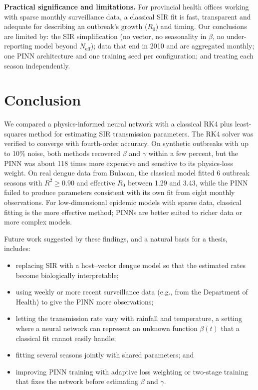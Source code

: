 \documentclass[12pt,a4paper]{article}
\newcommand{\Rzero}{R_0}
\newcommand{\Neff}{N_{\mathrm{eff}}}
\begin{document}
\textbf{Practical significance and limitations.} For provincial health offices working with sparse monthly surveillance data, a classical SIR fit is fast, transparent and adequate for describing an outbreak's growth ($\Rzero$) and timing. Our conclusions are limited by: the SIR simplification (no vector, no seasonality in $\beta$, no under-reporting model beyond $\Neff$); data that end in 2010 and are aggregated monthly; one PINN architecture and one training seed per configuration; and treating each season independently.

\section{Conclusion}

We compared a physics-informed neural network with a classical RK4 plus least-squares method for estimating SIR transmission parameters. The RK4 solver was verified to converge with fourth-order accuracy. On synthetic outbreaks with up to 10\% noise, both methods recovered $\beta$ and $\gamma$ within a few percent, but the PINN was about 118 times more expensive and sensitive to its physics-loss weight. On real dengue data from Bulacan, the classical model fitted 6 outbreak seasons with $R^2\ge0.90$ and effective $\Rzero$ between 1.29 and 3.43, while the PINN failed to produce parameters consistent with its own fit from eight monthly observations. For low-dimensional epidemic models with sparse data, classical fitting is the more effective method; PINNs are better suited to richer data or more complex models.

Future work suggested by these findings, and a natural basis for a thesis, includes:
\begin{itemize}[nosep]
  \item replacing SIR with a host--vector dengue model \citep{esteva1998} so that the estimated rates become biologically interpretable;
  \item using weekly or more recent surveillance data (e.g., from the Department of Health) to give the PINN more observations;
  \item letting the transmission rate vary with rainfall and temperature, a setting where a neural network can represent an unknown function $\beta(t)$ that a classical fit cannot easily handle;
  \item fitting several seasons jointly with shared parameters; and
  \item improving PINN training with adaptive loss weighting or two-stage training that fixes the network before estimating $\beta$ and $\gamma$.
\end{itemize}
\end{document}
